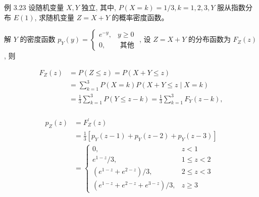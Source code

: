 \documentclass{beamer}
\begin{document}
	\begin{frame}
		例 3.23 设随机变量 $X, Y$ 独立, 其中, $P(X=k)=1 / 3, k=1,2,3, Y$ 服从指数分布 $E(1)$, 求随机变量 $Z=X+Y$ 的概率密度函数。
	\end{frame}
	
	\begin{frame}
		解 $Y$ 的密度函数 $p_{Y}(y)=\left\{\begin{array}{cc}e^{-y}, & y \geqslant 0 \\ 0, & \text { 其他 }\end{array}\right.$, 设 $Z=X+Y$ 的分布函数为 $F_{Z}(z)$, 则
		
		\begin{align*}
			F_{Z}(z) & =P(Z \leqslant z)=P(X+Y \leqslant z) \\
			& =\sum_{k=1}^{3} P(X=k) P(X+Y \leqslant z \mid X=k) \\
			& =\frac{1}{3} \sum_{k=1}^{3} P(Y \leqslant z-k)=\frac{1}{3} \sum_{k=1}^{3} F_{Y}(z-k), \\
		\end{align*}
	\end{frame}
	\begin{frame}
		\begin{align*}
			p_{Z}(z) & = F_{Z}^{\prime}(z) \\
			& =\frac{1}{3}\left[p_{Y}(z-1)+p_{Y}(z-2)+p_{Y}(z-3)\right] \\
			& = \begin{cases}
				0, & z<1 \\
				e^{1-z} / 3, & 1 \leqslant z<2 \\
				\left(e^{1-z}+e^{2-z}\right) / 3, & 2 \leqslant z<3 \\
				\left(e^{1-z}+e^{2-z}+e^{3-z}\right) / 3, & z \geqslant 3
			\end{cases}
		\end{align*}
	\end{frame}
\end{document}
